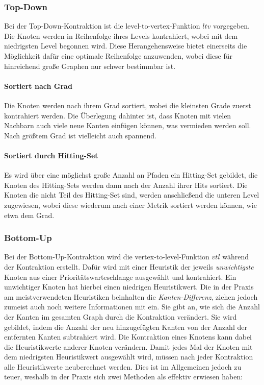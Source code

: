 \subsubsection{Top-Down}
Bei der Top-Down-Kontraktion ist die level-to-vertex-Funktion ${ltv}$ vorgegeben.
Die Knoten werden in Reihenfolge ihres Levels kontrahiert, wobei mit dem niedrigsten Level begonnen wird.
Diese Herangehensweise bietet einerseits die Möglichkeit dafür eine optimale Reihenfolge anzuwenden, wobei diese für hinreichend große Graphen nur schwer bestimmbar ist.

\paragraph{Sortiert nach Grad}
Die Knoten werden nach ihrem Grad sortiert, wobei die kleinsten Grade zuerst kontrahiert werden.
Die Überlegung dahinter ist, dass Knoten mit vielen Nachbarn auch viele neue Kanten einfügen können, was vermieden werden soll.
Nach größtem Grad ist vielleicht auch spannend.

\paragraph{Sortiert durch Hitting-Set}
Es wird über eine möglichst große Anzahl an Pfaden ein Hitting-Set gebildet, die Knoten des Hitting-Sets werden dann nach der Anzahl ihrer Hits sortiert.
Die Knoten die nicht Teil des Hitting-Set sind, werden anschließend die unteren Level zugewiesen, wobei diese wiederum nach einer Metrik sortiert werden können, wie etwa dem Grad.

\subsubsection{Bottom-Up}

Bei der Bottom-Up-Kontraktion wird die vertex-to-level-Funktion ${vtl}$ während der Kontraktion erstellt.
Dafür wird mit einer Heuristik der jeweils \emph{unwichtigste} Knoten aus einer Prioritätswarteschlange ausgewählt und kontrahiert.
Ein unwichtiger Knoten hat hierbei einen niedrigen Heuristikwert.
Die in der Praxis am meistverwendeten Heuristiken beinhalten die \emph{Kanten-Differenz}, ziehen jedoch zumeist auch noch weitere Informationen mit ein.
Sie gibt an, wie sich die Anzahl der Kanten im gesamten Graph durch die Kontraktion verändert.
Sie wird gebildet, indem die Anzahl der neu hinzugefügten Kanten von der Anzahl der entfernten Kanten subtrahiert wird.
Die Kontraktion eines Knotens kann dabei die Heuristikwerte anderer Knoten verändern.
Damit jedes Mal der Knoten mit dem niedrigsten Heuristikwert ausgewählt wird, müssen nach jeder Kontraktion alle Heuristikwerte neuberechnet werden.
Dies ist im Allgemeinen jedoch zu teuer, weshalb in der Praxis sich zwei Methoden als effektiv erwiesen haben:

